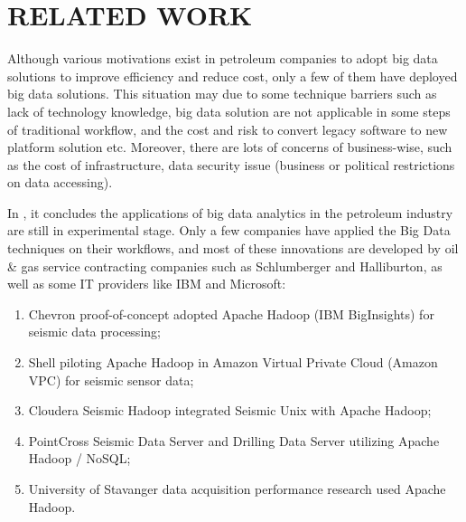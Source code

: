 %
%
%

\chapter{\uppercase{Related Work}}


Although various motivations exist in petroleum companies to adopt big data solutions to improve efficiency and reduce cost, only a few of them have deployed big data solutions. This situation may due to some technique barriers such as lack of technology knowledge, big data solution are not applicable in some steps of traditional workflow, and the cost and risk to convert legacy software to new platform solution etc. Moreover, there are lots of concerns of business-wise, such as the cost of infrastructure, data security issue (business or political restrictions on data accessing). 

In \cite{bigdatatooil}, it concludes the applications of big data analytics in the petroleum industry are still in experimental stage. Only a few companies have applied the Big Data techniques on their workflows, and most of these innovations are developed by oil \& gas service contracting companies such as Schlumberger and Halliburton, as well as some IT providers like IBM and Microsoft: \\

\begin{enumerate}
  \item Chevron proof-of-concept adopted Apache Hadoop (IBM BigInsights) for seismic data processing;
  \item Shell piloting Apache Hadoop in Amazon Virtual Private Cloud (Amazon VPC) for seismic sensor data;
  \item Cloudera Seismic Hadoop integrated Seismic Unix with Apache Hadoop;
  \item PointCross Seismic Data Server and Drilling Data Server utilizing Apache Hadoop / NoSQL;
  \item University of Stavanger data acquisition performance research used Apache Hadoop.
\end{enumerate}


